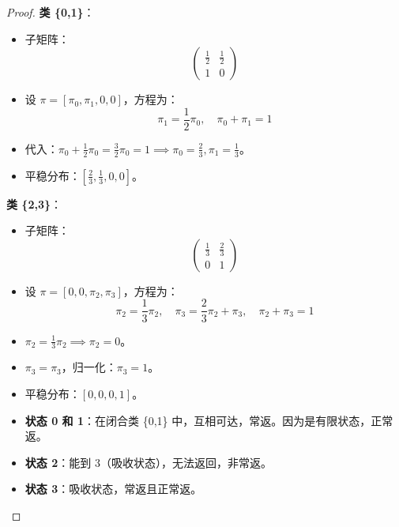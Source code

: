 \documentclass[lang=cn,10pt,thmcnt=section]{elegantbook}
\begin{document}
\begin{proof}
\textbf{类 \{0,1\}}：
\begin{itemize}
    \item 子矩阵：
    \[
    \begin{pmatrix}
    \frac{1}{2} & \frac{1}{2} \\
    1 & 0
    \end{pmatrix}
    \]
    \item 设 \(\pi = [\pi_0, \pi_1, 0, 0]\)，方程为：
    \[
    \pi_1 = \frac{1}{2}\pi_0, \quad \pi_0 + \pi_1 = 1
    \]
    \item 代入：\(\pi_0 + \frac{1}{2}\pi_0 = \frac{3}{2}\pi_0 = 1 \implies \pi_0 = \frac{2}{3}, \pi_1 = \frac{1}{3}\)。
    \item 平稳分布：\(\left[\frac{2}{3}, \frac{1}{3}, 0, 0\right]\)。
\end{itemize}

\textbf{类 \{2,3\}}：
\begin{itemize}
    \item 子矩阵：
    \[
    \begin{pmatrix}
    \frac{1}{3} & \frac{2}{3} \\
    0 & 1
    \end{pmatrix}
    \]
    \item 设 \(\pi = [0, 0, \pi_2, \pi_3]\)，方程为：
    \[
    \pi_2 = \frac{1}{3}\pi_2, \quad \pi_3 = \frac{2}{3}\pi_2 + \pi_3, \quad \pi_2 + \pi_3 = 1
    \]
    \item \(\pi_2 = \frac{1}{3}\pi_2 \implies \pi_2 = 0\)。
    \item \(\pi_3 = \pi_3\)，归一化：\(\pi_3 = 1\)。
    \item 平稳分布：\([0, 0, 0, 1]\)。
\end{itemize}
\begin{itemize}
    \item \textbf{状态 0 和 1}：在闭合类 \{0,1\} 中，互相可达，常返。因为是有限状态，正常返。
    \item \textbf{状态 2}：能到 3（吸收状态），无法返回，非常返。
    \item \textbf{状态 3}：吸收状态，常返且正常返。
\end{itemize}
\end{proof}
\end{document}
